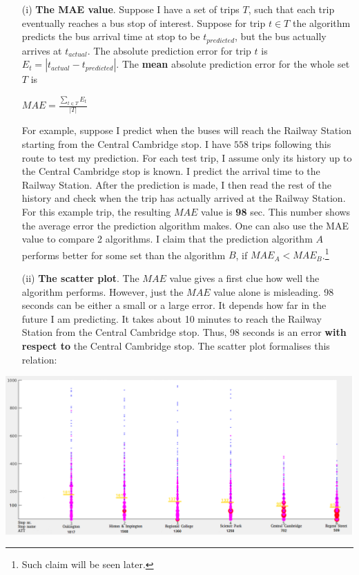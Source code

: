 \documentclass[12pt,a4paper,oneside,openright]{report}
\begin{document}
\begin{enumerate}
\item[(i)]
    \textbf{The MAE value}. Suppose I have a set
    of trips $T$, such that each trip eventually reaches a bus stop of interest. 
    Suppose for trip $t \in T$ the algorithm predicts the bus arrival time
    at stop to be $t_{predicted}$, but the bus actually arrives at $t_{actual}$.
    The absolute prediction error for trip $t$ is
    $E_t = |t_{actual} - t_{predicted}|$. The \textbf{mean} absolute prediction
    error for the whole set $T$ is

    \begin{center}
        $MAE = \frac{\sum\nolimits_{t \in {T}}{E_t}}{|T|}$
    \end{center}

    For example, suppose I predict when the buses will reach the Railway Station
    starting from the Central Cambridge stop. I have $558$ trips
    following this route to test my prediction. For each test trip, I assume
    only its history up to the Central Cambridge stop is known. I predict
    the arrival time to the Railway Station. After the prediction is made,
    I then read the rest of the history and check when the trip has actually
    arrived at the Railway Station. For this example trip, the resulting
    $MAE$ value is \textbf{98} sec. This number shows the average error the
    prediction algorithm makes. One can also use the MAE value to compare
    2 algorithms. I claim that the prediction algorithm $A$ performs better
    for some set than the algorithm $B$, if $MAE_A < MAE_B$.\footnote{Such claim will
    be seen later.}

\item[(ii)] \textbf{The scatter plot}. The $MAE$ value gives a first
   clue how well the algorithm performs. However, just the $MAE$ value
   alone is misleading. 98 seconds can be either a small or a large
   error. It depends how far in the future I am predicting. It takes about 10 
   minutes to reach the Railway Station from the Central Cambridge stop. Thus,
   98 seconds is an error \textbf{with respect to} the Central Cambridge stop. 
   The scatter plot formalises this relation:


\end{enumerate}

\includegraphics[width=\textwidth]{figs/scatter_plot.png} \\
\end{document}
